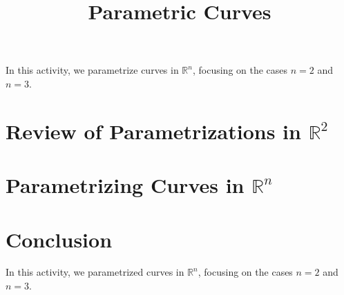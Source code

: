 \documentclass{ximera}
\title{Parametric Curves}
\begin{document}
\begin{abstract}
\end{abstract}
\maketitle

In this activity, we parametrize curves in $\mathbb{R}^n$, focusing on the cases $n=2$ and $n=3$.

\section{Review of Parametrizations in $\mathbb{R}^2$}



\section{Parametrizing Curves in $\mathbb{R}^n$}



\section{Conclusion}

In this activity, we parametrized curves in $\mathbb{R}^n$, focusing on the cases $n=2$ and $n=3$.
\end{document}
